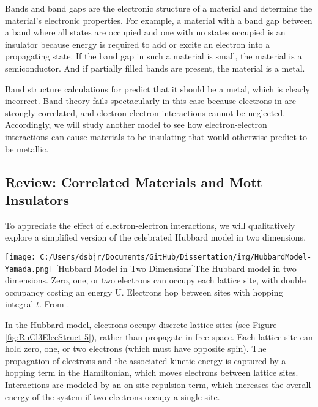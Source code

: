 Bands and band gaps are the electronic structure of a material and determine the material's electronic properties. For example, a material with a band gap between a band where all states are occupied and one with no states occupied is an insulator because energy is required to add or excite an electron into a propagating state. If the band gap in such a material is small, the material is a semiconductor. And if partially filled bands are present, the material is a metal.

Band structure calculations for \rucl predict that it should be a metal, which is clearly incorrect. Band theory fails spectacularly in this case because electrons in \rucl are strongly correlated, and electron-electron interactions cannot be neglected. Accordingly, we will study another model to see how electron-electron interactions can cause materials to be insulating that would otherwise predict to be metallic.

\subsection{Review: Correlated Materials and Mott Insulators}

To appreciate the effect of electron-electron interactions, we will qualitatively explore a simplified version of the celebrated Hubbard model in two dimensions.

\begin{centering}
\texttt{[image: C:/Users/dsbjr/Documents/GitHub/Dissertation/img/HubbardModel-Yamada.png]}
  \captionsetup{width=0.5\textwidth}
  [Hubbard Model in Two Dimensions]{The Hubbard model in two dimensions. Zero, one, or two electrons can occupy each lattice site, with double occupancy costing an energy U. Electrons hop between sites with hopping integral $t$. From \cite{Yamada2018}.}
  \label{fig:RuCl3ElecStruct-5}
\end{centering}


In the Hubbard model, electrons occupy discrete lattice sites (see Figure \ref{fig:RuCl3ElecStruct-5}), rather than propagate in free space. Each lattice site can hold zero, one, or two electrons (which must have opposite spin). The propagation of electrons and the associated kinetic energy is captured by a hopping term in the Hamiltonian, which moves electrons between lattice sites. Interactions are modeled by an on-site repulsion term, which increases the overall energy of the system if two electrons occupy a single site.

